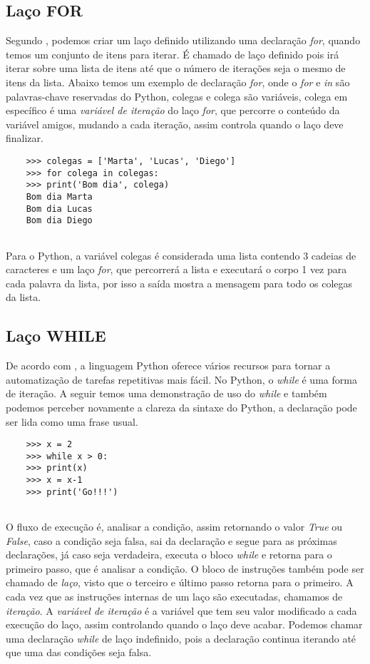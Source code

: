             \subsection{Laço FOR}
	Segundo \cite{Severance2016}, podemos criar um laço definido utilizando uma declaração \textit{for}, quando temos um conjunto de itens para iterar. É chamado de laço definido pois irá iterar sobre uma lista de itens até que o número de iterações seja o mesmo de itens da lista. Abaixo temos um exemplo de declaração \textit{for}, onde o \textit{for} e \textit{in} são palavras-chave reservadas do Python, colegas e colega são variáveis, colega em específico é uma \textit{variável de iteração} do laço \textit{for}, que percorre o conteúdo da variável amigos, mudando a cada iteração, assim controla quando o laço deve finalizar.
	\begin{lstlisting}
	>>> colegas = ['Marta', 'Lucas', 'Diego']
	>>> for colega in colegas:
	>>>	print('Bom dia', colega)
	Bom dia Marta
	Bom dia Lucas
	Bom dia Diego
		
	\end{lstlisting}
	Para o Python, a variável colegas é considerada uma lista contendo 3 cadeias de caracteres e um laço \textit{for}, que percorrerá a lista e executará o corpo 1 vez para cada palavra da lista, por isso a saída mostra a mensagem para todo os colegas da lista.
            \subsection{Laço WHILE}
	De acordo com \cite{Severance2016}, a linguagem Python oferece vários recursos para tornar a automatização de tarefas repetitivas mais fácil. No Python, o \textit{while} é uma forma de iteração. A seguir temos uma demonstração de uso do \textit{while} e também podemos perceber novamente a clareza da sintaxe do Python, a declaração pode ser lida como uma frase usual.
	\begin{lstlisting}
	>>> x = 2
	>>> while x > 0:
	>>>	print(x)
	>>>	x = x-1
	>>> print('Go!!!')
		
	\end{lstlisting}
	O fluxo de execução é, analisar a condição, assim retornando o valor \textit{True} ou \textit{False}, caso a condição seja falsa, sai da declaração e segue para as próximas declarações, já caso seja verdadeira, executa o bloco \textit{while} e retorna para o primeiro passo, que é analisar a condição. O bloco de instruções também pode ser chamado de \textit{laço}, visto que o terceiro e último passo retorna para o primeiro. A cada vez que as instruções internas de um laço são executadas, chamamos de \textit{iteração}. A \textit{variável de iteração} é a variável que tem seu valor modificado a cada execução do laço, assim controlando quando o laço deve acabar. Podemos chamar uma declaração \textit{while} de laço indefinido, pois a declaração continua iterando até que uma das condições seja falsa. \cite{Severance2016}
	
